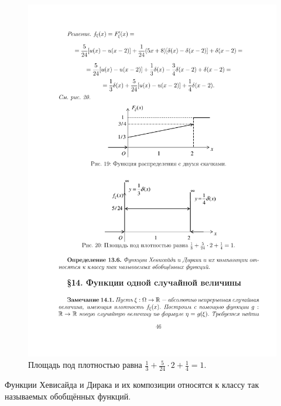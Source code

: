 \begin{figure}[h!]
	\centering
	\includegraphics[]{pic/pic20}
	\caption{Площадь под плотностью равна 
				$\frac{1}{3}+\frac{5}{24}\cdot 2+\frac{1}{4}= 1$.}
	\label{fig20}
\end{figure}

\begin{definition}
	Функции Хевисайда и Дирака и их композиции относятся к классу так называемых обобщённых функций.
\end{definition}